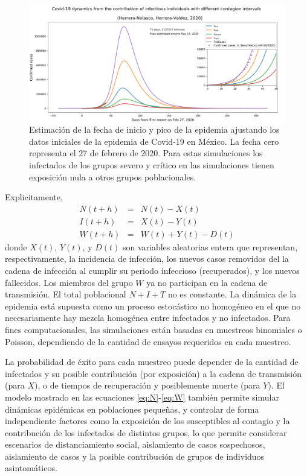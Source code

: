 \begin{figure}[h]
\includegraphics[width=\textwidth]{figures/Covid19_Mexico_InitialFit_Herrera-Valdez+Herrera-Nolasco_2020}
\caption{Estimación de la fecha de inicio y pico de la epidemia ajustando los datos iniciales de la epidemia de Covid-19 en México. La fecha cero representa el 27 de febrero de 2020. Para estas simulaciones los infectados de los grupos severo y crítico en las simulaciones tienen exposición nula a otros grupos poblacionales. } \label{fig:inicioPicoNIW}
\end{figure}

Explicitamente,
\begin{eqnarray}
N(t+h) &=& N(t) - X(t)
 \label{eq:N} \\
I(t+h) &=& X(t) - Y(t)
\label{eq:I}\\
W(t+h) &=& W(t) + Y(t) - D(t)
\label{eq:W}
\end{eqnarray}
donde $X(t)$, $Y(t)$, y $D(t)$ son variables aleatorias entera que representan, respectivamente, la incidencia de infección, los nuevos casos removidos del la cadena de infección al cumplir su periodo infeccioso (recuperados), y los nuevos fallecidos. Los miembros del grupo $W$ ya no participan en la cadena de transmisión. El total poblacional $N+I+T$ no es constante. La dinámica de la epidemia está supuesta como un proceso estocástico no homogéneo en el que no necesariamente hay mezcla homogénea entre infectados y no infectados. Para fines computacionales, las simulaciones están basadas en muestreos binomiales o Poisson, dependiendo de la cantidad de ensayos requeridos en cada muestreo.

 La probabilidad de éxito para cada muestreo puede depender de la cantidad de infectados y su posible contribución (por exposición) a la cadena de transmisión (para $X$), o de tiempos de recuperación y posiblemente muerte (para $Y$). El modelo mostrado en las ecuaciones \eqref{eq:N}-\eqref{eq:W} también permite simular dinámicas epidémicas en poblaciones pequeñas, y controlar de forma independiente  factores como la exposición de los susceptibles al contagio y la contribución de los infectados de distintos grupos, lo que permite considerar escenarios de distanciamiento social, aislamiento de casos sospechosos, aislamiento de casos y la posible contribución de grupos de individuos asintomáticos.


